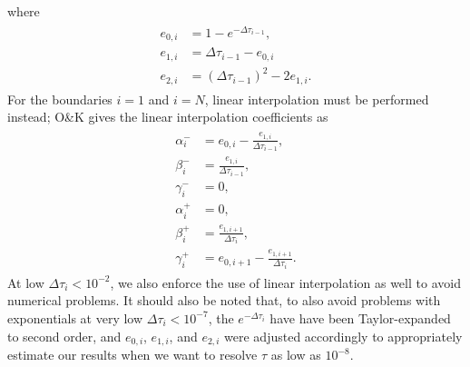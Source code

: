 \documentclass[12pt]{article}
\begin{document}
where
\begin{align}
\begin{split}
e_{0, i}
&=
1 - e^{-\Delta\tau_{i - 1}},
\\
e_{1, i}
&=
\Delta\tau_{i - 1} - e_{0, i}
\\
e_{2, i}
&=
(\Delta\tau_{i - 1})^2 - 2 e_{1, i}.
\end{split}
\end{align}
For the boundaries $i = 1$ and $i = N$, linear interpolation must be performed instead; O\&K gives the linear interpolation coefficients as
\begin{align}
\begin{split}
\alpha_i^-
&=
e_{0, i} - \frac{e_{1, i}}{\Delta \tau_{i - 1}},
\\
\beta_i^-
&=
\frac{e_{1, i}}{\Delta \tau_{i - 1}},
\\
\gamma_i^-
&=
0,
\\
\alpha_i^+
&=
0,
\\
\beta_i^+
&=
\frac{e_{1, i + 1}}{\Delta \tau_i},
\\
\gamma_i^+
&=
e_{0, i + 1} - \frac{e_{1, i + 1}}{\Delta \tau_i}.
\end{split}
\end{align}
At low $\Delta \tau_i < 10^{-2}$, we also enforce the use of linear interpolation as well to avoid numerical problems. It should also be noted that, to also avoid problems with exponentials at very low $\Delta \tau_i < 10^{-7}$, the $e^{-\Delta \tau_i}$ have have been Taylor-expanded to second order, and $e_{0, i}$, $e_{1, i}$, and $e_{2, i}$ were adjusted accordingly to appropriately estimate our results when we want to resolve $\tau$ as low as $10^{-8}$.
\end{document}
